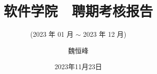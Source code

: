 \documentclass[]{beamer}
\title[2023 聘期考核报告]{软件学院 $\;$ 聘期考核报告}
\subtitle{(2023 年 01 月 $\sim$ 2023 年 12 月)}
\author[魏恒峰]{魏恒峰}
\institute{hfwei@nju.edu.cn}
\date{2023年11月23日}
\begin{document}
\maketitle





\thankyou{}
\end{document}

